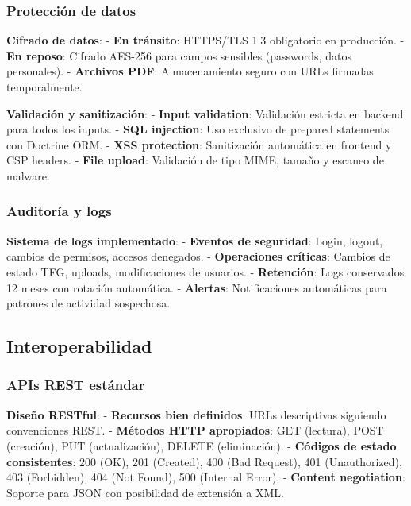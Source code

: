 \documentclass[12pt,a4paper,oneside]{report}
\begin{document}
\subsubsection{Protección de datos}\label{protecciuxf3n-de-datos}

\textbf{Cifrado de datos}: - \textbf{En tránsito}: HTTPS/TLS 1.3
obligatorio en producción. - \textbf{En reposo}: Cifrado AES-256 para
campos sensibles (passwords, datos personales). - \textbf{Archivos PDF}:
Almacenamiento seguro con URLs firmadas temporalmente.

\textbf{Validación y sanitización}: - \textbf{Input validation}:
Validación estricta en backend para todos los inputs. - \textbf{SQL
injection}: Uso exclusivo de prepared statements con Doctrine ORM. -
\textbf{XSS protection}: Sanitización automática en frontend y CSP
headers. - \textbf{File upload}: Validación de tipo MIME, tamaño y
escaneo de malware.

\subsubsection{Auditoría y logs}\label{auditoruxeda-y-logs}

\textbf{Sistema de logs implementado}: - \textbf{Eventos de seguridad}:
Login, logout, cambios de permisos, accesos denegados. -
\textbf{Operaciones críticas}: Cambios de estado TFG, uploads,
modificaciones de usuarios. - \textbf{Retención}: Logs conservados 12
meses con rotación automática. - \textbf{Alertas}: Notificaciones
automáticas para patrones de actividad sospechosa.

\subsection{Interoperabilidad}\label{interoperabilidad}

\subsubsection{APIs REST estándar}\label{apis-rest-estuxe1ndar}

\textbf{Diseño RESTful}: - \textbf{Recursos bien definidos}: URLs
descriptivas siguiendo convenciones REST. - \textbf{Métodos HTTP
apropiados}: GET (lectura), POST (creación), PUT (actualización), DELETE
(eliminación). - \textbf{Códigos de estado consistentes}: 200 (OK), 201
(Created), 400 (Bad Request), 401 (Unauthorized), 403 (Forbidden), 404
(Not Found), 500 (Internal Error). - \textbf{Content negotiation}:
Soporte para JSON con posibilidad de extensión a XML.
\end{document}
